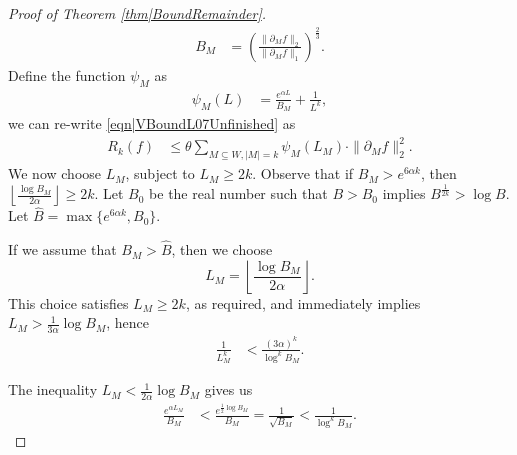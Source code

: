 \documentclass[reqno]{amsart}
\begin{document}
\begin{proof}[Proof of Theorem \ref{thm|BoundRemainder}]
\begin{align} B_M&=\left(\frac{\|\partial_Mf\|_2}{\|\partial_Mf\|_1}\right)^{\frac23}.
\label{eqn|DefinitionBMN}\end{align}
 Define the function $\psi_M$ as 
\begin{align} \psi_M(L) &=\frac{e^{\alpha L}}{B_M}+\frac1{L^k},
\label{eqn|definitionOfPsi}\end{align} we can re-write \eqref{eqn|VBoundL07Unfinished} as 
\begin{align} 
R_k(f)&\leq
\theta \sum_{M\subseteq W, |M|=k}\psi_M(L_M)\cdot\|\partial_Mf\|_2^2.
\label{eqn|VBoundL07}
\end{align} 
We now choose $L_M$, subject to $L_M\geq 2k$.
Observe that if $B_M>e^{6\alpha k}$, then $\left\lfloor\frac{\log B_M}{2\alpha}\right\rfloor\geq 2k$. Let $B_0$ be the real number such that $B>B_0$ implies $B^{\frac1{2k}}>\log B$. Let $\hat B=\max\{e^{6\alpha k},B_0\}$.
 
If we assume that $B_M>\hat B$, then we choose \[L_M=\left\lfloor\frac{\log B_M}{2\alpha}\right\rfloor.\]
This choice satisfies $L_M\geq 2k$, as required, and immediately implies $L_M>\frac1{3\alpha}\log B_M$, hence \begin{align}\frac{1}{L_M^k} &< \frac{\left(3\alpha\right)^k}{\log^kB_M}. \label{eqn|PsiBound1}\end{align}
 

The inequality $L_M<\frac1{2\alpha}\log B_M$ gives us 
\begin{align} \frac{e^{\alpha L_M}}{B_M}&<\frac{e^{\frac12\log B_M}}{B_M}=\frac1{\sqrt{B_M}}<\frac1{\log^kB_M}.
\label{eqn|PsiBound2}
\end{align}



\end{proof}
\end{document}
